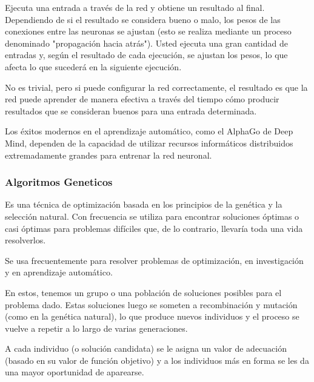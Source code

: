\documentclass[fleqn, journal]{IEEEtran}                        %
\theoremstyle{break}                                            %
\begin{document}
                Ejecuta una entrada a través de la red y obtiene un resultado al final. Dependiendo de si el
                resultado se considera bueno o malo, los pesos de las conexiones entre las neuronas se ajustan
                (esto se realiza mediante un proceso denominado "propagación hacia atrás"). Usted ejecuta una
                gran cantidad de entradas y, según el resultado de cada ejecución, se ajustan los pesos, lo que
                afecta lo que sucederá en la siguiente ejecución.

                No es trivial, pero si puede configurar la red correctamente, el resultado es que la red puede
                aprender de manera efectiva a través del tiempo cómo producir resultados que se consideran buenos
                para una entrada determinada.

                Los éxitos modernos en el aprendizaje automático, como el AlphaGo de Deep Mind, dependen de la
                capacidad de utilizar recursos informáticos distribuidos extremadamente grandes para entrenar
                la red neuronal.


            \vspace{1em}
            \subsubsection{Algoritmos Geneticos}

                Es una técnica de optimización basada en los principios de la genética y la selección natural.
                Con frecuencia se utiliza para encontrar soluciones óptimas o casi óptimas para problemas difíciles
                que, de lo contrario, llevaría toda una vida resolverlos.
                
                Se usa frecuentemente para resolver problemas de optimización, en investigación y en aprendizaje automático.

                En estos, tenemos un grupo o una población de soluciones posibles para el problema dado.
                Estas soluciones luego se someten a recombinación y mutación (como en la genética natural),
                lo que produce nuevos individuos y el proceso se vuelve a repetir a lo largo de varias generaciones. 
                
                A cada individuo (o solución candidata) se le asigna un valor de adecuación
                (basado en su valor de función objetivo) y a los individuos más en forma se
                les da una mayor oportunidad de aparearse.
\end{document}
